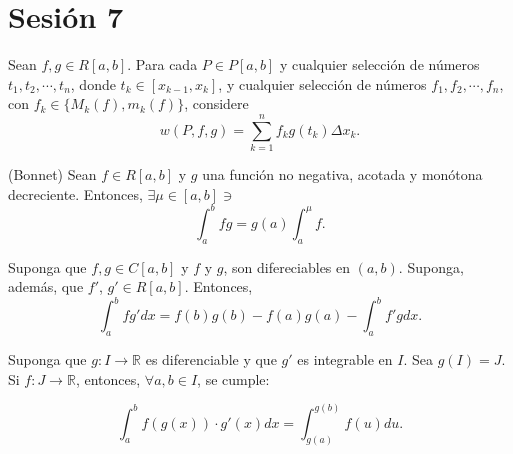 \section{Sesión 7}

\begin{lema}
	Sean $f,g \in R[a,b]$. Para cada $P\in P[a,b]$ y cualquier selección de números $t_1,t_2,\cdots, t_n$, donde $t_k\in [x_{k-1},x_k]$, y cualquier selección de números $f_1,f_2,\cdots, f_n$, con $f_k\in \{M_k(f), m_k(f)\}$, considere 
	$$w(P,f,g)=\sum_{k=1}^n f_k g(t_k)\Delta x_k.$$
\end{lema}

\begin{teorema}(Bonnet)
	Sean $f\in R[a,b]$ y $g$ una función no negativa, acotada y monótona decreciente. Entonces, $\exists \mu \in [a,b]\ni$ 
	$$\int_a^b fg=g(a)\int_a^\mu f.$$
\end{teorema}

\begin{teorema}
	Suponga que $f,g\in C[a,b]$ y $f$ y $g$, son difereciables en $(a,b)$. Suponga, además, que $f'$, $g'\in R[a,b]$. Entonces, 
	$$\int_a^b fg'dx=f(b)g(b)-f(a)g(a)-\int_a^b f'g dx.$$
\end{teorema}

\begin{teorema}
	Suponga que $g:I\to\mathbb{R}$ es diferenciable y que $g'$ es integrable en $I$. Sea $g(I)=J$. Si $f:J\to\mathbb{R}$, entonces, $\forall a, b\in I$, se cumple: 
	
	$$\int_a^b f(g(x))\cdot g'(x)dx=\int_{g(a)}^{g(b)}f(u)du.$$
\end{teorema}
